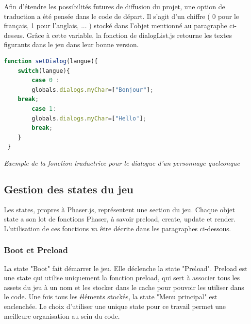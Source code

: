 \documentclass[11pt]{article}
\begin{document}
 Afin d'étendre les possibilités futures de diffusion du projet, une option de traduction a été pensée dans le code de départ. Il s'agit d'un chiffre ( 0 pour le français, 1 pour l'anglais, ... ) stocké dans l'objet mentionné au paragraphe ci-dessus. Grâce à cette variable, la fonction de dialogList.js retourne les textes figurants dans le jeu dans leur bonne version. \\
 \begin{lstlisting}[language=JavaScript]
 function setDialog(langue){
    switch(langue){
        case 0 : 
        globals.dialogs.myChar=["Bonjour"];
    break;
        case 1:
        globals.dialogs.myChar=["Hello"];
		break;
 	}
 }
\end{lstlisting}
\textit{Exemple de la fonction traductrice pour le dialogue d'un personnage quelconque}
\subsection{Gestion des states du jeu}
Les states, propres à Phaser.js, représentent une section du jeu. Chaque objet state a son lot de fonctions Phaser, à savoir preload, create, update et render. L'utilisation de ces fonctions va être décrite dans les paragraphes ci-dessous.

\subsubsection{Boot et Preload}
La state "Boot" fait démarrer le jeu. Elle déclenche la state "Preload". Preload est une state qui utilise uniquement la fonction preload, qui sert à associer tous les assets du jeu à un nom et les stocker dans le cache pour pouvoir les utiliser dans le code. Une fois tous les éléments stockés, la state "Menu principal" est enclenchée. Le choix d'utiliser une unique state pour ce travail permet une meilleure organisation au sein du code.
\end{document}
